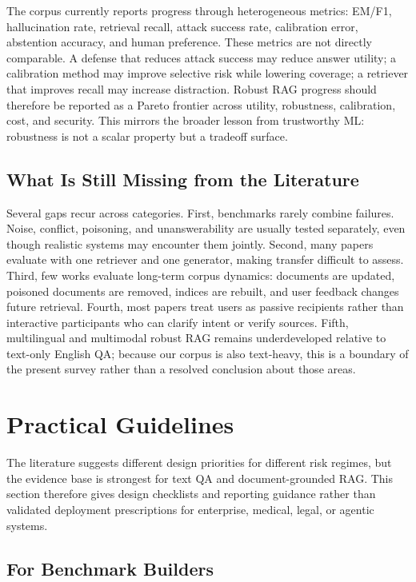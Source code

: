 \documentclass[11pt]{article}
\begin{document}
The corpus currently reports progress through heterogeneous metrics: EM/F1, hallucination rate, retrieval recall, attack success rate, calibration error, abstention accuracy, and human preference. These metrics are not directly comparable. A defense that reduces attack success may reduce answer utility; a calibration method may improve selective risk while lowering coverage; a retriever that improves recall may increase distraction. Robust RAG progress should therefore be reported as a Pareto frontier across utility, robustness, calibration, cost, and security. This mirrors the broader lesson from trustworthy ML: robustness is not a scalar property but a tradeoff surface.

\subsection{What Is Still Missing from the Literature}

Several gaps recur across categories. First, benchmarks rarely combine failures. Noise, conflict, poisoning, and unanswerability are usually tested separately, even though realistic systems may encounter them jointly. Second, many papers evaluate with one retriever and one generator, making transfer difficult to assess. Third, few works evaluate long-term corpus dynamics: documents are updated, poisoned documents are removed, indices are rebuilt, and user feedback changes future retrieval. Fourth, most papers treat users as passive recipients rather than interactive participants who can clarify intent or verify sources. Fifth, multilingual and multimodal robust RAG remains underdeveloped relative to text-only English QA; because our corpus is also text-heavy, this is a boundary of the present survey rather than a resolved conclusion about those areas.

\section{Practical Guidelines}
\label{sec:guidelines}

The literature suggests different design priorities for different risk regimes, but the evidence base is strongest for text QA and document-grounded RAG. This section therefore gives design checklists and reporting guidance rather than validated deployment prescriptions for enterprise, medical, legal, or agentic systems.

\subsection{For Benchmark Builders}
\end{document}
